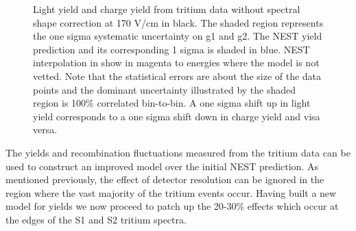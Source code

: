 \begin{figure}[h!]
\hfill
{}

\caption{Light yield and charge yield from tritium data without spectral shape correction at 170 V/cm in black. The shaded region represents the one sigma systematic uncertainty on g1 and g2. The NEST yield prediction and its corresponding 1 sigma is shaded in blue. NEST interpolation in show in magenta to energies where the model is not vetted. Note that the statistical errors are about the size of the data points and the dominant uncertainty illustrated by the shaded region is 100\% correlated bin-to-bin. A one sigma shift up in light yield corresponds to a one sigma shift down in charge yield and visa versa.}
\label{fig:LYQY_iter0}
\end{figure}
\renewcommand{\baselinestretch}{2}
\small\normalsize

The yields and recombination fluctuations measured from the tritium data can be used to construct an improved model over the initial NEST prediction. As mentioned previously, the effect of detector resolution can be ignored in the region where the vast majority of the tritium events occur. Having built a new model for yields we now proceed to patch up the 20-30\% effects which occur at the edges of the S1 and S2 tritium spectra.



